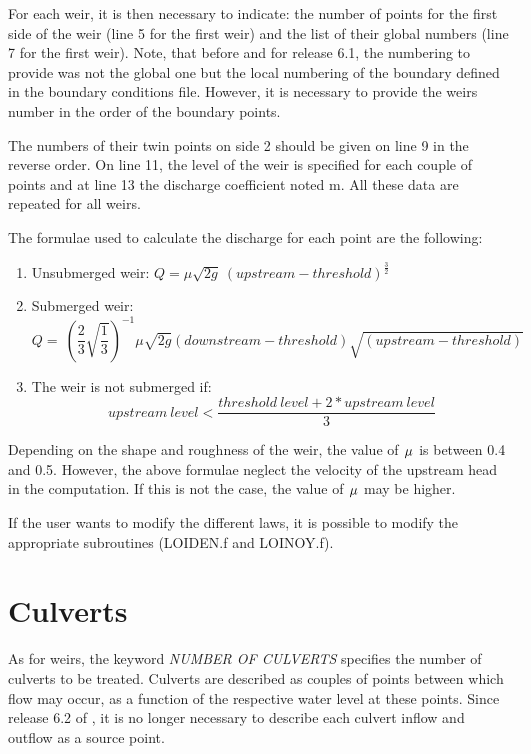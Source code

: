  For each weir, it is then necessary to indicate: the number of points for the first side of the weir (line 5 for the first weir) and the list of their global numbers (line 7 for the first weir). Note, that before and for release 6.1, the numbering to provide was not the global one but the local numbering of the boundary defined in the boundary conditions file. However, it is necessary to provide the weirs number in the order of the boundary points.

 The numbers of their twin points on side 2 should be given on line 9 in the reverse order. On line 11, the level of the weir is specified for each couple of points and at line 13 the discharge coefficient noted m. All these data are repeated for all weirs.

 The formulae used to calculate the discharge for each point are the following:

\begin{enumerate}
\item  Unsubmerged weir: $Q=\mu \sqrt{2g}\ {\left(upstream-threshold\right)}^{\frac{3}{2}}$

\item  Submerged weir:
\[Q=\ {\left(\frac{2}{3}\sqrt{\frac{1}{3}}\right)}^{-1}\mu \sqrt{2g}\left(downstream-threshold\right)\sqrt{\left(upstream-threshold\right)}\]

\item  The weir is not submerged if:
\[upstream\ level<\frac{threshold\ level+2*upstream\ level}{3}\]
\end{enumerate}
Depending on the shape and roughness of the weir, the value of ${\kern 1pt} \mu $ is between 0.4 and 0.5. However, the above formulae neglect the velocity of the upstream head in the computation. If this is not the case, the value of ${\kern 1pt} \mu $ may be higher.

 If the user wants to modify the different laws, it is possible to modify the appropriate subroutines (LOIDEN.f and LOINOY.f).

\section{ Culverts}
\label{sec:culverts}
 As for weirs, the keyword \textit{NUMBER OF CULVERTS} specifies the number of culverts to be treated. Culverts are described as couples of points between which flow may occur, as a function of the respective water level at these points. Since release 6.2 of , it is no longer necessary to describe each culvert inflow and outflow as a source point.

